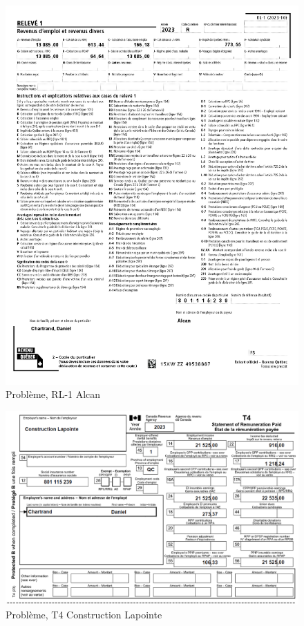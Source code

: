 \begin{figure}
	\centering
	\includegraphics[width=.9\textwidth]{probleme/chapitre-2/RL1-Alcan.png}
	\caption[]{Problème, RL-1 Alcan}
	\label{fig:pb2RL1Alcan}
\end{figure}

\begin{figure}
	\centering
	\includegraphics[width=.9\textwidth]{probleme/chapitre-2/T4-ConstructionLapointe.png}
	\caption[]{Problème, T4 Construction Lapointe}
	\label{fig:pb2T4ConstructionLapointe}
\end{figure}

